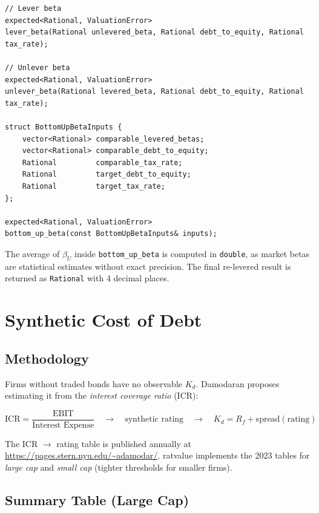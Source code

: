 \documentclass[12pt, a4paper, oneside]{book}
\newcommand{\Kd}{K_d}
\newcommand{\Rf}{R_f}
\begin{document}
\begin{lstlisting}[style=cpp]
// Lever beta
expected<Rational, ValuationError>
lever_beta(Rational unlevered_beta, Rational debt_to_equity, Rational tax_rate);

// Unlever beta
expected<Rational, ValuationError>
unlever_beta(Rational levered_beta, Rational debt_to_equity, Rational tax_rate);

struct BottomUpBetaInputs {
    vector<Rational> comparable_levered_betas;
    vector<Rational> comparable_debt_to_equity;
    Rational         comparable_tax_rate;
    Rational         target_debt_to_equity;
    Rational         target_tax_rate;
};

expected<Rational, ValuationError>
bottom_up_beta(const BottomUpBetaInputs& inputs);
\end{lstlisting}

\begin{warning}
The average of $\beta_U$ inside \texttt{bottom\_up\_beta} is computed in
\texttt{double}, as market betas are statistical estimates without exact
precision. The final re-levered result is returned as \texttt{Rational}
with 4 decimal places.
\end{warning}

\section{Synthetic Cost of Debt}
\label{sec:kd_sint}

\subsection{Methodology}

Firms without traded bonds have no observable $\Kd$. Damodaran proposes
estimating it from the \emph{interest coverage ratio} (ICR):

\[
  \text{ICR} = \frac{\text{EBIT}}{\text{Interest Expense}}
  \quad\longrightarrow\quad
  \text{synthetic rating}
  \quad\longrightarrow\quad
  \Kd = \Rf + \text{spread}(\text{rating})
\]

The ICR $\to$ rating table is published annually at
\url{https://pages.stern.nyu.edu/~adamodar/}.
ratvalue implements the 2023 tables for \emph{large cap} and
\emph{small cap} (tighter thresholds for smaller firms).

\subsection{Summary Table (Large Cap)}
\end{document}
